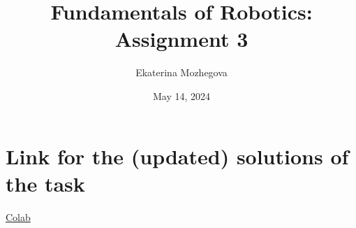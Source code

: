 \documentclass{article}
\title{Fundamentals of Robotics: Assignment 3}
\author{Ekaterina Mozhegova}
\date{May 14, 2024}
\begin{document}
\maketitle

\section{Link for the (updated) solutions of the task}


\href{https://colab.research.google.com/drive/1Ja4AgicXrXQCgEBnWQVlY5cgWEgvaRgQ?usp=sharing}{Colab}
\end{document}
